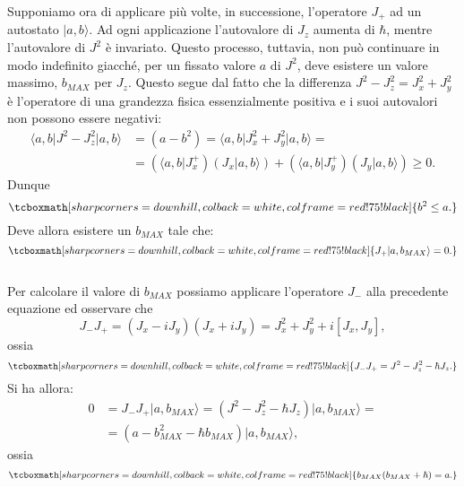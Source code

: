 \documentclass[a4paper,12pt,oneside]{book}
\begin{document}
Supponiamo ora di applicare più volte, in successione, l'operatore $J_+$ ad un autostato $\vert a,b \rangle $. Ad ogni applicazione l'autovalore di $J_z$ aumenta di $\hbar$, mentre l'autovalore di $J^2$ è invariato. Questo processo, tuttavia, non può continuare in modo indefinito giacché, per un fissato valore $a$ di $J^2$, deve esistere un valore massimo, $b_{MAX}$ per $J_z$. Questo segue dal fatto che la differenza $J^2-J_z ^2=J_x ^2+J_y ^2$ è l'operatore di una grandezza fisica essenzialmente positiva e i suoi autovalori non possono essere negativi:
	\begin{align}
		\langle a,b \vert J^2-J_z ^2 \vert a, b \rangle &= (a-b^2) =  \langle a,b \vert J_x ^2+J_y ^2 \vert a, b \rangle = \nonumber \\
		&=\left(\langle a,b \vert J_x ^+\right) \left(J_x \vert a, b \rangle\right)+\left(\langle a,b \vert J_y ^+\right) \left(J_y \vert a, b \rangle\right) \geq 0.
	\end{align}
Dunque
	\begin{equation}
		\tcboxmath[sharp corners=downhill, colback=white, colframe=red!75!black]{
			b^2 \leq a .
			}
	\label{eq:cap16_6}
	\end{equation}
Deve allora esistere un $b_{MAX}$ tale che:
	\begin{equation}
		\tcboxmath[sharp corners=downhill, colback=white, colframe=red!75!black]{
			J_{+} \vert a, b_{MAX} \rangle =0.
			}
	\end{equation}\\
	
Per calcolare il valore di $b_{MAX}$ possiamo applicare l'operatore $J_-$ alla precedente equazione ed osservare che 
	\begin{equation}
		J_-J_+ = (J_x-iJ_y)(J_x+iJ_y)= J_x^2 +J_y ^2+i[J_x, J_y] ,
	\end{equation}
ossia 
	\begin{equation}
		\tcboxmath[sharp corners=downhill, colback=white, colframe=red!75!black]{
			J_-J_+ = J^2 -J_z ^2 -\hbar J_z .
			}
	\label{eq:cap16_7}
	\end{equation}
Si ha allora:
	\begin{align}
		0&=J_{-}J_{+} \vert a, b_{MAX} \rangle = (J^2 -J_z ^2 -\hbar J_z)\vert a, b_{MAX} \rangle = \nonumber \\
		&=(a- b_{MAX} ^2 - \hbar b_{MAX} )\vert a, b_{MAX} \rangle,
	\end{align}
ossia
	\begin{equation}
		\tcboxmath[sharp corners=downhill, colback=white, colframe=red!75!black]{
			b_{MAX}(b_{MAX}+\hbar) =a .
			}
	\label{eq:cap16_8}
	\end{equation}\\
	
\end{document}
